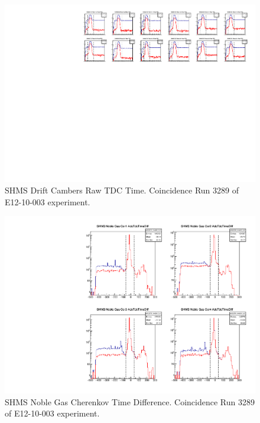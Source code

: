 \documentclass[14pt]{article}
\begin{document}
\begin{figure}[H]
  \captionsetup{justification=raggedright,singlelinecheck=false}
  \includegraphics[scale=0.95]{plots/pDC_rawTDC_window.pdf}
  \caption{SHMS Drift Cambers Raw TDC Time. Coincidence Run 3289 of E12-10-003 experiment.}
  \label{fig:shms_dc_rawtime}
\end{figure}
\begin{figure}[H]
  \begin{center}
  \captionsetup{justification=raggedright,singlelinecheck=false}
  \includegraphics[scale=0.4]{plots/pNGCER_timeWindow.pdf}
  \caption{SHMS Noble Gas Cherenkov Time Difference. Coincidence Run 3289 of E12-10-003 experiment.}
  \label{fig:shms_ngcer_difftime}
  \end{center}
\end{figure}
\end{document}
